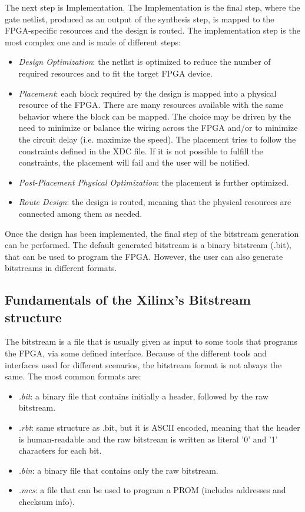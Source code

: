 The next step is Implementation. The Implementation is the final step, where the gate netlist, produced as an output of the synthesis step, is mapped to the FPGA-specific resources and the design is routed. The implementation step is the most complex one and is made of different steps:

\begin{itemize}
    \item \textit{Design Optimization}: the netlist is optimized to reduce the number of required resources and to fit the target FPGA device.
    \item \textit{Placement}: each block required by the design is mapped into a physical resource of the FPGA. There are many resources available with the same behavior where the block can be mapped. The choice may be driven by the need to minimize or balance the wiring across the FPGA and/or to minimize the circuit delay (i.e. maximize the speed). The placement tries to follow the constraints defined in the XDC file. If it is not possible to fulfill the constraints, the placement will fail and the user will be notified.
    \item \textit{Post-Placement Physical Optimization}: the placement is further optimized.
    \item \textit{Route Design}: the design is routed, meaning that the physical resources are connected among them as needed. 
\end{itemize}

Once the design has been implemented, the final step of the bitstream generation can be performed. The default generated bitstream is a binary bitstream (.bit), that can be used to program the FPGA. However, the user can also generate bitstreams in different formats.

\subsection{Fundamentals of the Xilinx's Bitstream structure}
\label{sec:bitstream_struct}

The bitstream is a file that is usually given as input to some tools that programs the FPGA, via some defined interface. Because of the different tools and interfaces used for different scenarios, the bitstream format is not always the same. The most common formats are:

\begin{itemize}
    \item \textit{.bit}: a binary file that contains initially a header, followed by the raw bitstream.
    \item \textit{.rbt}: same structure as .bit, but it is ASCII encoded, meaning that the header is human-readable and the raw bitstream is written as literal '0' and '1' characters for each bit.
    \item \textit{.bin}: a binary file that contains only the raw bitstream.
    \item \textit{.mcs}: a file that can be used to program a PROM (includes addresses and checksum info).
\end{itemize}

